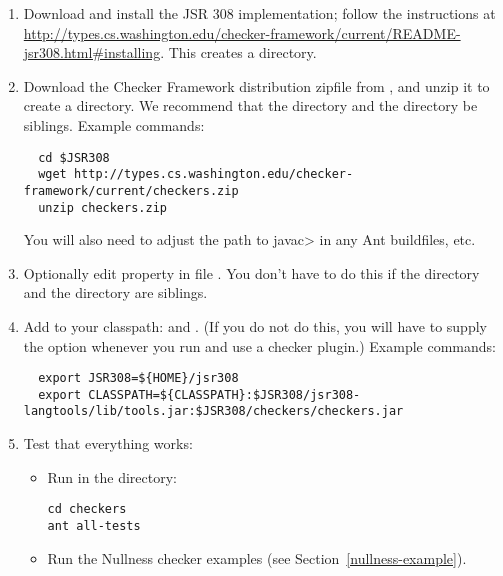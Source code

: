 \begin{enumerate}

\item Download and install the JSR 308 implementation; follow the instructions at
{\codesize\url{http://types.cs.washington.edu/checker-framework/current/README-jsr308.html#installing}}.
This creates a  directory.

\item Download the Checker Framework distribution zipfile from
,
and unzip it to create a  directory.  We recommend that the
 directory and the  directory be siblings.
Example commands:

\begin{Verbatim}
  cd $JSR308
  wget http://types.cs.washington.edu/checker-framework/current/checkers.zip
  unzip checkers.zip
\end{Verbatim}

You will also need to adjust the path to \<javac> in any Ant buildfiles,
etc.

\item Optionally edit property  in file
  .  You don't have to do this if the
   directory and the  directory are
  siblings.

\item Add to your classpath:
   and
  .
  (If you do not do this, you will have to supply the  option
  whenever you run  and use a checker plugin.)  Example
  commands:

\begin{smaller}
\begin{Verbatim}
  export JSR308=${HOME}/jsr308
  export CLASSPATH=${CLASSPATH}:$JSR308/jsr308-langtools/lib/tools.jar:$JSR308/checkers/checkers.jar
\end{Verbatim}
\end{smaller}

\item Test that everything works:

  \begin{itemize}

  \item Run  in the  directory:
\begin{Verbatim}
cd checkers
ant all-tests
\end{Verbatim}

  \item Run the Nullness checker examples (see
    Section~\ref{nullness-example}).

  \end{itemize}

\end{enumerate}

